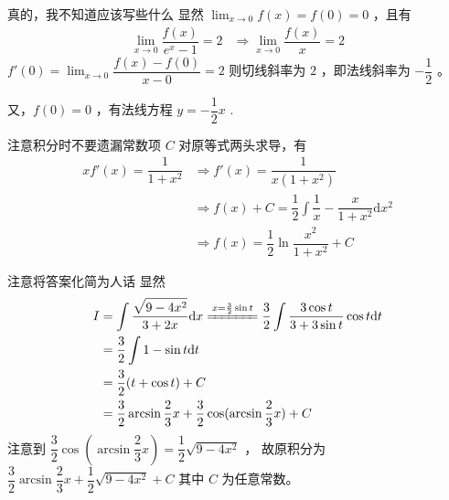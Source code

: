\begin{answer}[660T49]{真的，我不知道应该写些什么}
    显然 $ {\displaystyle\lim_{x\rightarrow 0}}f(x) = f(0) = 0 $ ，且有
    \begin{equation*}
        \begin{aligned}
            {\displaystyle\lim_{x\rightarrow 0}}\dfrac{f(x)}{e^x - 1} = 2 &\Rightarrow
            {\displaystyle\lim_{x\rightarrow 0}}\dfrac{f(x)}{x} = 2
        \end{aligned}
    \end{equation*}
    $ f'(0) = {\displaystyle\lim_{x\rightarrow 0}}\dfrac{f(x) - f(0)}{x - 0} = 2 $ 
    则切线斜率为 $ 2 $ ，即法线斜率为 $ -\dfrac{1}{2} $ 。
    
    又，$ f(0) = 0 $ ，有法线方程
    $ y = -\dfrac{1}{2}x $ .
\end{answer}

\begin{answer}[660T51]{注意积分时不要遗漏常数项 $ C $ }
    对原等式两头求导，有
    \begin{equation*}
        \begin{aligned}
            xf'(x) = \dfrac{1}{1+x^2} &\Rightarrow f'(x) = \dfrac{1}{x(1+x^2)}
            \\&\Rightarrow f(x) + C = \dfrac{1}{2} \int \dfrac{1}{x} - \dfrac{x}{1+x^2} \mathrm{d}x^2
            \\&\Rightarrow f(x) = \dfrac{1}{2}\ln\dfrac{x^2}{1+x^2} + C
        \end{aligned}
    \end{equation*}
\end{answer}

\begin{answer}[660T52]{注意将答案化简为人话}
    显然\begin{equation*}
        \begin{aligned}
            I & = \int \dfrac{\dsqrt{9-4x^2}}{3+2x}\mathrm{d}x 
            \xlongequal{x = \frac{3}{2}\sin t} \dfrac{3}{2}
            \int \dfrac{3\cos t}{3+3\sin t} \cos t\mathrm{d}t
            \\&= \dfrac{3}{2}\int 1 - \sin t\mathrm{d}t \\&=
            \dfrac{3}{2}(t + \cos t) + C 
            \\&= \dfrac{3}{2}\arcsin \dfrac{2}{3}x + \dfrac{3}{2}\cos (\arcsin \dfrac{2}{3}x) + C
        \end{aligned}
    \end{equation*}
    注意到 $ \dfrac{3}{2}\cos (\arcsin \dfrac{2}{3}x) = \dfrac{1}{2}\sqrt{9-4x^2} $ ，
    故原积分为 $ \dfrac{3}{2}\arcsin \dfrac{2}{3}x + \dfrac{1}{2}\sqrt{9-4x^2} + C $ 
    其中 $ C $ 为任意常数。
\end{answer}

